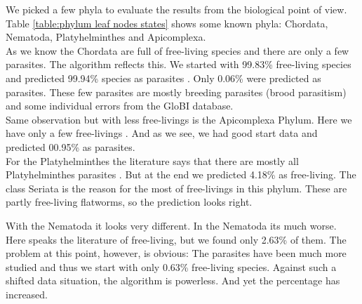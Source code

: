       We picked a few phyla to evaluate the results from the biological point of view. \\
      Table \ref{table:phylum leaf nodes states} shows some known phyla: Chordata, Nematoda, 
        Platyhelminthes and Apicomplexa. \\
      As we know  the Chordata are full of free-living species and there are only a 
        few parasites. The algorithm reflects this. We started with 99.83\% free-living species and 
        predicted 99.94\% species as parasites . Only 0.06\% were 
        predicted as parasites. These few parasites are mostly breeding parasites (brood parasitism) and 
        some individual errors from the GloBI database. \\
      Same observation but with less free-livings is the Apicomplexa Phylum. Here we have only a few 
        free-livings . And as we see, we had good start data and predicted 00.95\% as 
        parasites. \\
      For the Platyhelminthes the literature says that there are mostly all Platyhelminthes parasites
        . But at the end we predicted 4.18\% as free-living. The class Seriata is the 
        reason for the most of free-livings in this phylum. These are partly free-living flatworms, so 
        the prediction looks right. \\
      
      With the Nematoda it looks very different.  In the Nematoda its much worse. Here speaks the 
        literature of  free-living, but we found only 2.63\% of them. The problem at 
        this point, however, is obvious: The parasites have been much more studied and thus we start 
        with only 0.63\% free-living species. Against such a shifted data situation, the algorithm is 
        powerless. And yet the percentage has increased.

